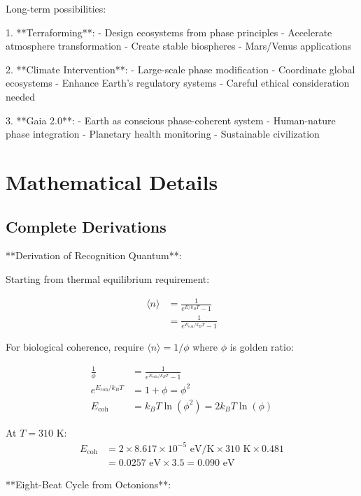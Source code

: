 \documentclass[12pt,a4paper]{report}
\begin{document}
Long-term possibilities:

1. **Terraforming**:
   - Design ecosystems from phase principles
   - Accelerate atmosphere transformation
   - Create stable biospheres
   - Mars/Venus applications

2. **Climate Intervention**:
   - Large-scale phase modification
   - Coordinate global ecosystems
   - Enhance Earth's regulatory systems
   - Careful ethical consideration needed

3. **Gaia 2.0**:
   - Earth as conscious phase-coherent system
   - Human-nature phase integration
   - Planetary health monitoring
   - Sustainable civilization

\appendix

\chapter{Mathematical Details}

\section{Complete Derivations}

**Derivation of Recognition Quantum**:

Starting from thermal equilibrium requirement:

\begin{align}
\langle n \rangle &= \frac{1}{e^{E/k_B T} - 1} \\
&= \frac{1}{e^{E_{\text{coh}}/k_B T} - 1}
\end{align}

For biological coherence, require $\langle n \rangle = 1/\phi$ where $\phi$ is golden ratio:

\begin{align}
\frac{1}{\phi} &= \frac{1}{e^{E_{\text{coh}}/k_B T} - 1} \\
e^{E_{\text{coh}}/k_B T} &= 1 + \phi = \phi^2 \\
E_{\text{coh}} &= k_B T \ln(\phi^2) = 2k_B T \ln(\phi)
\end{align}

At $T = 310$ K:
\begin{align}
E_{\text{coh}} &= 2 \times 8.617 \times 10^{-5} \text{ eV/K} \times 310 \text{ K} \times 0.481 \\
&= 0.0257 \text{ eV} \times 3.5 = 0.090 \text{ eV}
\end{align}

**Eight-Beat Cycle from Octonions**:
\end{document}
